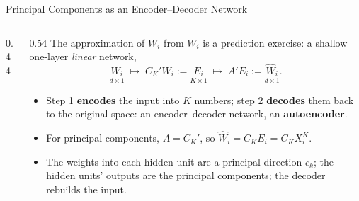 \documentclass[aspectratio=169,11pt,xcolor=dvipsnames]{beamer}
\begin{document}
\begin{frame}{Principal Components as an Encoder--Decoder Network}
\begin{columns}[c]
\begin{column}{0.44\linewidth}
\begin{center}
\end{center}
\end{column}
\begin{column}{0.54\linewidth}
\small
The approximation of $W_i$ from $W_i$ is a prediction exercise: a shallow one-layer
\emph{linear} network,
\[
  \underset{d\times 1}{W_i} \;\mapsto\; C_K'W_i := \underset{K\times 1}{E_i}
  \;\mapsto\; A'E_i := \underset{d\times 1}{\hat W_i}.
\]
\vskip-4pt
\begin{itemize}\itemsep2pt
  \item Step 1 \textbf{encodes} the input into $K$ numbers; step 2 \textbf{decodes} them
        back to the original space: an encoder--decoder network, an \textbf{autoencoder}.
  \item For principal components, $A = C_K'$, so $\hat W_i = C_K E_i = C_K X_i^K$.
  \item The weights into each hidden unit are a principal direction $c_k$; the hidden units'
        outputs are the principal components; the decoder rebuilds the input.
\end{itemize}
\end{column}
\end{columns}
\end{frame}
\end{document}
